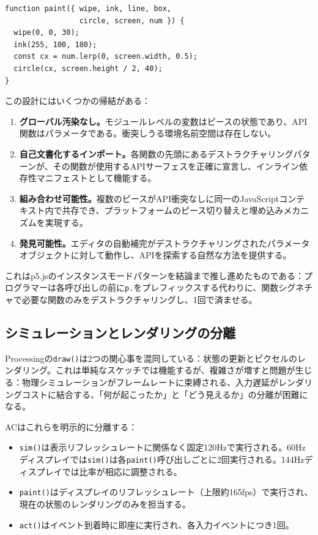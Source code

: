 \documentclass[10pt,letterpaper,twocolumn]{article}
\begin{document}
\begin{lstlisting}[style=acjsstyle,caption={ACにおけるAPIデストラクチャリング。}]
function paint({ wipe, ink, line, box,
                 circle, screen, num }) {
  wipe(0, 0, 30);
  ink(255, 100, 180);
  const cx = num.lerp(0, screen.width, 0.5);
  circle(cx, screen.height / 2, 40);
}
\end{lstlisting}

この設計にはいくつかの帰結がある：

\begin{enumerate}
  \item \textbf{グローバル汚染なし。}モジュールレベルの変数はピースの状態であり、API関数はパラメータである。衝突しうる環境名前空間は存在しない。
  \item \textbf{自己文書化するインポート。}各関数の先頭にあるデストラクチャリングパターンが、その関数が使用するAPIサーフェスを正確に宣言し、インライン依存性マニフェストとして機能する。
  \item \textbf{組み合わせ可能性。}複数のピースがAPI衝突なしに同一のJavaScriptコンテキスト内で共存でき、プラットフォームのピース切り替えと埋め込みメカニズムを実現する。
  \item \textbf{発見可能性。}エディタの自動補完がデストラクチャリングされたパラメータオブジェクトに対して動作し、APIを探索する自然な方法を提供する。
\end{enumerate}

これはp5.jsのインスタンスモードパターンを結論まで推し進めたものである：プログラマーは各呼び出しの前に\texttt{p.}をプレフィックスする代わりに、関数シグネチャで必要な関数のみをデストラクチャリングし、1回で済ませる。

\subsection{シミュレーションとレンダリングの分離}
\label{sec:simsep}

Processingの\texttt{draw()}は2つの関心事を混同している：状態の更新とピクセルのレンダリング。これは単純なスケッチでは機能するが、複雑さが増すと問題が生じる：物理シミュレーションがフレームレートに束縛される、入力遅延がレンダリングコストに結合する、「何が起こったか」と「どう見えるか」の分離が困難になる。

ACはこれらを明示的に分離する：

\begin{itemize}
  \item \texttt{sim()}は表示リフレッシュレートに関係なく固定120Hzで実行される。60Hzディスプレイでは\texttt{sim()}は各\texttt{paint()}呼び出しごとに2回実行される。144Hzディスプレイでは比率が相応に調整される。
  \item \texttt{paint()}はディスプレイのリフレッシュレート（上限約165fps）で実行され、現在の状態のレンダリングのみを担当する。
  \item \texttt{act()}はイベント到着時に即座に実行され、各入力イベントにつき1回。
\end{itemize}
\end{document}
